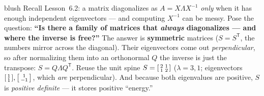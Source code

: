 \documentclass[10pt]{article}
\newcommand{\T}{\mathsf{T}}
\begin{document}
\begin{skillbox}[Hook]{blush}
    Recall Lesson~6.2: a matrix diagonalizes as $A=X\Lambda X^{-1}$ \emph{only} when it has enough
    independent eigenvectors --- and computing $X^{-1}$ can be messy. Pose the question: \textbf{``Is there a
    family of matrices that \emph{always} diagonalizes --- and where the inverse is free?''} The answer is
    \textbf{symmetric} matrices ($S=S^{\T}$, the numbers mirror across the diagonal). Their eigenvectors come
    out \emph{perpendicular}, so after normalizing them into an orthonormal $Q$ the inverse is just the
    transpose: $S=Q\Lambda Q^{\T}$. Reuse the unit spine $S=\begin{bsmallmatrix}2&1\\1&2\end{bsmallmatrix}$
    ($\lambda=3,1$; eigenvectors $\begin{bsmallmatrix}1\\1\end{bsmallmatrix},\begin{bsmallmatrix}1\\-1\end{bsmallmatrix}$,
    which \emph{are} perpendicular). And because both eigenvalues are positive, $S$ is \emph{positive
    definite} --- it stores positive ``energy.''
\end{skillbox}
\end{document}
